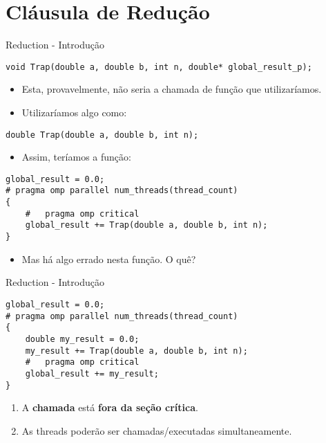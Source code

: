 \section{Cláusula de Redução}


\begin{frame}[fragile]{Reduction - Introdução}
	\begin{lstlisting}
void Trap(double a, double b, int n, double* global_result_p);
	\end{lstlisting}

	\begin{itemize}
		\item Esta, provavelmente, não seria a chamada de função que utilizaríamos.

				\pause

		\item Utilizaríamos algo como:
	\end{itemize}

	\begin{lstlisting}
double Trap(double a, double b, int n);
	\end{lstlisting}

			\pause

	\begin{itemize}
		\item Assim, teríamos a função:
	\end{itemize}

	\begin{lstlisting}
global_result = 0.0;
# pragma omp parallel num_threads(thread_count) 
{
    #   pragma omp critical
    global_result += Trap(double a, double b, int n); 
}
	\end{lstlisting}

			\pause

	\begin{itemize}
		\item Mas há algo errado nesta função. O quê?
	\end{itemize}
\end{frame}




\begin{frame}[fragile]{Reduction - Introdução}
	\begin{lstlisting}
global_result = 0.0;
# pragma omp parallel num_threads(thread_count)
{
	double my_result = 0.0;
	my_result += Trap(double a, double b, int n); 
	#	pragma omp critical
	global_result += my_result;
}
	\end{lstlisting}

	\begin{enumerate}
		\item A {\bf chamada} está {\bf fora da seção crítica}.
		\item As threads poderão ser chamadas/executadas simultaneamente.
	\end{enumerate}
\end{frame}





